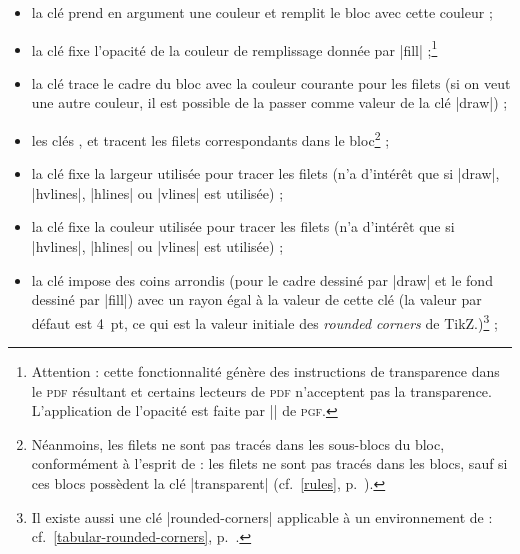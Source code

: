 \documentclass[dvipsnames]{article}
\begin{document}
\begin{itemize}[beginpenalty=10000]
\item {}
la clé  prend en argument une couleur et remplit le bloc
avec cette couleur ;
\item {}
la clé  fixe l'opacité de la couleur de remplissage donnée
par |fill| ;\footnote{Attention : cette fonctionnalité génère des
  instructions de transparence dans le \textsc{pdf} résultant et certains
  lecteurs de \textsc{pdf} n'acceptent pas la transparence. L'application de
  l'opacité est faite par |\pgfsetfillopacity| de \textsc{pgf}.}
\item {}
la clé  trace le cadre du bloc avec la couleur courante
pour les filets (si on veut une autre couleur, il est possible de la passer comme
valeur de la clé |draw|) ; 
\item {}
les clés ,  et 
tracent les filets correspondants dans le bloc\footnote{Néanmoins, les filets ne
  sont pas tracés dans les sous-blocs du bloc, conformément à l'esprit de
  : les filets ne sont pas tracés dans les blocs, sauf si ces blocs
  possèdent la clé |transparent| (cf.~\ref{rules}, p.~\pageref{rules}).} ;
\item {}
la clé  fixe la largeur utilisée pour tracer les
filets (n'a d'intérêt que si |draw|, |hvlines|,
|hlines| ou |vlines| est utilisée) ;

\item {}
la clé  fixe la couleur utilisée pour tracer les
filets (n'a d'intérêt que si |hvlines|, |hlines| ou |vlines| est utilisée) ;


\item \label{block-rounded-corners}
  la clé  impose des coins
arrondis (pour le cadre dessiné par |draw| et le fond dessiné par |fill|) avec
un rayon égal à la valeur de cette clé (la valeur par défaut est 4~pt, ce qui
est la valeur initiale des \emph{rounded corners} de TikZ.)\footnote{Il existe
  aussi une clé |rounded-corners| applicable à un environnement de
   : cf.~\ref{tabular-rounded-corners},
  p.~\pageref{tabular-rounded-corners}.} ;
\end{itemize}
\end{document}
